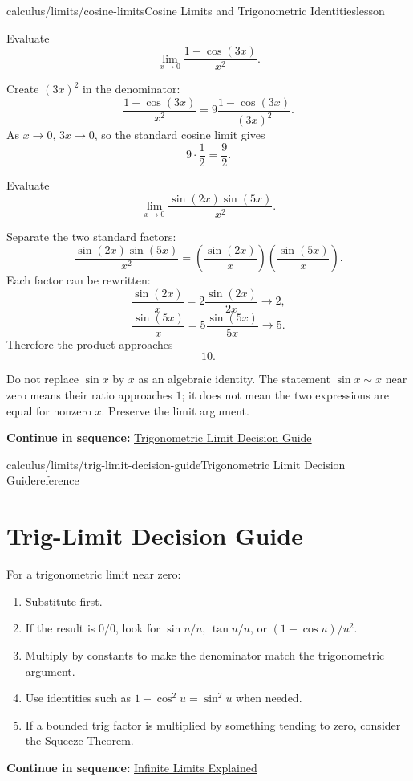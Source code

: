 \documentclass[11pt,openany]{book}
\theoremstyle{bgplain}
\newcounter{bgexample}[chapter]
\newcommand{\webnext}[2]{%
  \par\addvspace{1.2em}\noindent{\color{BGLine}\rule{\textwidth}{0.35pt}}\par\smallskip
  {\small\color{BGGray}\textbf{Continue in sequence:} \hyperlink{web:#1}{#2}}\par
}
\begin{document}
\begin{webpage}{calculus/limits/cosine-limits}{Cosine Limits and Trigonometric Identities}{lesson}
\begin{bgexample}[title={Identity plus a standard limit}]
Evaluate
\[
  \lim_{x\to0}\frac{1-\cos(3x)}{x^2}.
\]

\begin{bgsolution}
Create \((3x)^2\) in the denominator:
\[
  \frac{1-\cos(3x)}{x^2}
  =9\frac{1-\cos(3x)}{(3x)^2}.
\]
As \(x\to0\), \(3x\to0\), so the standard cosine limit gives
\[
  9\cdot\frac12=\boxed{\frac92}.
\]
\end{bgsolution}
\end{bgexample}

\begin{bgexample}[title={Exam-level: use an identity before the standard limit}]
Evaluate
\[
  \lim_{x\to0}\frac{\sin(2x)\sin(5x)}{x^2}.
\]

\begin{bgsolution}
Separate the two standard factors:
\[
\frac{\sin(2x)\sin(5x)}{x^2}
=\left(\frac{\sin(2x)}{x}\right)
 \left(\frac{\sin(5x)}{x}\right).
\]
Each factor can be rewritten:
\[
  \frac{\sin(2x)}{x}=2\frac{\sin(2x)}{2x}\to2,
\]
\[
  \frac{\sin(5x)}{x}=5\frac{\sin(5x)}{5x}\to5.
\]
Therefore the product approaches
\[
  \boxed{10}.
\]
\end{bgsolution}
\end{bgexample}

\begin{bgexamnote}
Do not replace \(\sin x\) by \(x\) as an algebraic identity. The statement \(\sin x\sim x\) near zero means their ratio approaches \(1\); it does not mean the two expressions are equal for nonzero \(x\). Preserve the limit argument.
\end{bgexamnote}
\webnext{calculus/limits/trig-limit-decision-guide}{Trigonometric Limit Decision Guide}
\end{webpage}

\begin{webpage}{calculus/limits/trig-limit-decision-guide}{Trigonometric Limit Decision Guide}{reference}
\section{Trig-Limit Decision Guide}

\begin{bgmethod}
For a trigonometric limit near zero:
\begin{enumerate}
  \item Substitute first.
  \item If the result is \(0/0\), look for \(\sin u/u\), \(\tan u/u\), or \((1-\cos u)/u^2\).
  \item Multiply by constants to make the denominator match the trigonometric argument.
  \item Use identities such as \(1-\cos^2u=\sin^2u\) when needed.
  \item If a bounded trig factor is multiplied by something tending to zero, consider the Squeeze Theorem.
\end{enumerate}
\end{bgmethod}
\webnext{calculus/limits/infinite-limits}{Infinite Limits Explained}
\end{webpage}
\end{document}
